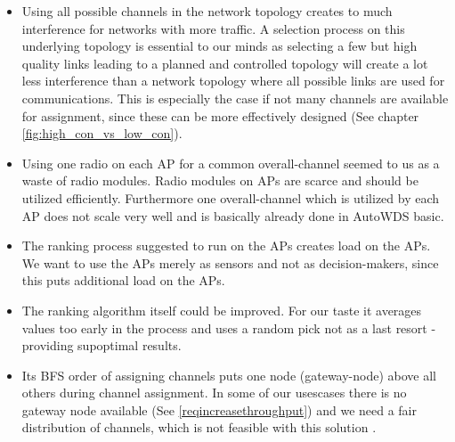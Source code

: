     \begin{itemize}
      \item Using all possible channels in the network topology creates to much interference for networks with more traffic.
	A selection process on this underlying topology is essential to our minds as selecting a few but high quality links
	leading to a planned and controlled topology will create a lot less interference than a network topology where all possible 
	links are used for communications. This is especially the case if not many channels are available for assignment, since 
	these can be more effectively designed (See chapter \ref{fig:high_con_vs_low_con}).
	\label{topologypreservingdealbreaker}
	
      \item Using one radio on each AP for a common overall-channel seemed to us as a waste of radio modules.
	Radio modules on APs are scarce and should be utilized efficiently. 
	Furthermore one overall-channel which is utilized by each AP does not scale very well and is basically already done in AutoWDS basic.
	
      \item The ranking process suggested to run on the APs creates load on the APs.
	We want to use the APs merely as sensors and not as decision-makers, since this puts additional load on the APs.
	
      \item The ranking algorithm itself could be improved. 
	For our taste it averages values too early in the process and uses a random pick not as a last resort - providing supoptimal results.
	
      \item Its \ac{BFS} order of assigning channels puts one node (gateway-node) above all others during channel assignment.
	In some of our usescases there is no gateway node available (See \ref{reqincreasethroughput}) and we need a fair distribution of channels, 
	which is not feasible with this solution \cite{overview_caa}.
    \end{itemize}

